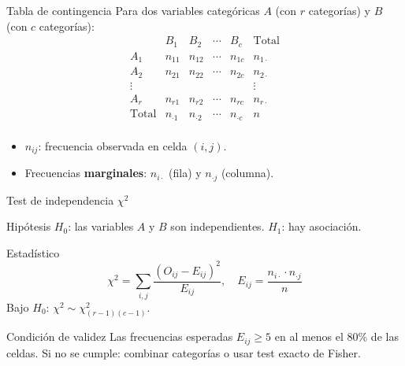 \documentclass[aspectratio=169]{beamer}
\begin{document}
\begin{frame}{Tabla de contingencia}
  Para dos variables categóricas $A$ (con $r$ categorías) y $B$ (con $c$ categorías):
  \[
    \begin{array}{c|cccc|c}
      & B_1 & B_2 & \cdots & B_c & \text{Total} \\
      \hline
      A_1 & n_{11} & n_{12} & \cdots & n_{1c} & n_{1\cdot} \\
      A_2 & n_{21} & n_{22} & \cdots & n_{2c} & n_{2\cdot} \\
      \vdots & & & & & \vdots \\
      A_r & n_{r1} & n_{r2} & \cdots & n_{rc} & n_{r\cdot} \\
      \hline
      \text{Total} & n_{\cdot 1} & n_{\cdot 2} & \cdots & n_{\cdot c} & n \\
    \end{array}
  \]
  \begin{itemize}
    \item $n_{ij}$: frecuencia observada en celda $(i,j)$.
    \item Frecuencias \textbf{marginales}: $n_{i\cdot}$ (fila) y $n_{\cdot j}$ (columna).
  \end{itemize}
\end{frame}

\begin{frame}{Test de independencia $\chi^2$}
  \begin{block}{Hipótesis}
    $H_0$: las variables $A$ y $B$ son independientes. \quad $H_1$: hay asociación.
  \end{block}
  \begin{block}{Estadístico}
    \[
      \chi^2 = \sum_{i,j} \frac{(O_{ij} - E_{ij})^2}{E_{ij}}, \quad
      E_{ij} = \frac{n_{i\cdot} \cdot n_{\cdot j}}{n}
    \]
    Bajo $H_0$: $\chi^2 \sim \chi^2_{(r-1)(c-1)}$.
  \end{block}
  \begin{alertblock}{Condición de validez}
    Las frecuencias esperadas $E_{ij} \ge 5$ en al menos el 80\% de las celdas. Si no se cumple: combinar categorías o usar test exacto de Fisher.
  \end{alertblock}
\end{frame}
\end{document}
